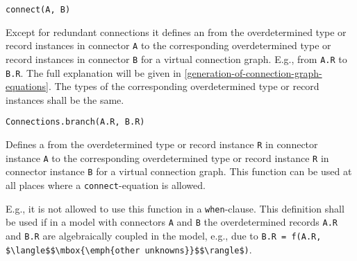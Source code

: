 \begin{operatordefinition*}[connect]\label{modelica:optional-spanning-tree-edge}
\begin{synopsis}\begin{lstlisting}
connect(A, B)
\end{lstlisting}\end{synopsis}
\begin{semantics}
Except for redundant connections it defines an  from the overdetermined type or record instances in connector \lstinline!A! to the corresponding overdetermined type or record instances in connector \lstinline!B! for a virtual connection graph.
E.g., from \lstinline!A.R! to \lstinline!B.R!.
The full explanation will be given in \cref{generation-of-connection-graph-equations}.
The types of the corresponding overdetermined type or record instances shall be the same.
\end{semantics}
\end{operatordefinition*}

\begin{operatordefinition}
\begin{synopsis}\begin{lstlisting}
Connections.branch(A.R, B.R)
\end{lstlisting}\end{synopsis}
\begin{semantics}
Defines a  from the overdetermined type or record instance \lstinline!R! in connector instance \lstinline!A! to the corresponding overdetermined type or record instance \lstinline!R! in connector instance \lstinline!B! for a virtual connection graph.
This function can be used at all places where a \lstinline!connect!-equation is allowed.

\begin{nonnormative}
E.g., it is not allowed to use this function in a \lstinline!when!-clause.
This definition shall be used if in a model with connectors \lstinline!A! and \lstinline!B! the overdetermined records \lstinline!A.R! and \lstinline!B.R! are algebraically coupled in the model, e.g., due to \lstinline!B.R = f(A.R, $\langle$$\mbox{\emph{other unknowns}}$$\rangle$)!.
\end{nonnormative}
\end{semantics}
\end{operatordefinition}

